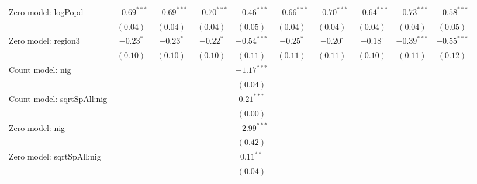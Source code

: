 \begin{center}
\begin{longtable}{l c c c c c c c c c}
Zero model: logPopd            & $-0.69^{***}$ & $-0.69^{***}$ & $-0.70^{***}$ & $-0.46^{***}$   & $-0.66^{***}$ & $-0.70^{***}$   & $-0.64^{***}$   & $-0.73^{***}$ & $-0.58^{***}$ \\
                               & $(0.04)$      & $(0.04)$      & $(0.04)$      & $(0.05)$        & $(0.04)$      & $(0.04)$        & $(0.04)$        & $(0.04)$      & $(0.05)$      \\
Zero model: region3            & $-0.23^{*}$   & $-0.23^{*}$   & $-0.22^{*}$   & $-0.54^{***}$   & $-0.25^{*}$   & $-0.20^{\cdot}$ & $-0.18^{\cdot}$ & $-0.39^{***}$ & $-0.55^{***}$ \\
                               & $(0.10)$      & $(0.10)$      & $(0.10)$      & $(0.11)$        & $(0.11)$      & $(0.11)$        & $(0.10)$        & $(0.11)$      & $(0.12)$      \\
Count model: nig               &               &               &               & $-1.17^{***}$   &               &                 &                 &               &               \\
                               &               &               &               & $(0.04)$        &               &                 &                 &               &               \\
Count model: sqrtSpAll:nig     &               &               &               & $0.21^{***}$    &               &                 &                 &               &               \\
                               &               &               &               & $(0.00)$        &               &                 &                 &               &               \\
Zero model: nig                &               &               &               & $-2.99^{***}$   &               &                 &                 &               &               \\
                               &               &               &               & $(0.42)$        &               &                 &                 &               &               \\
Zero model: sqrtSpAll:nig      &               &               &               & $0.11^{**}$     &               &                 &                 &               &               \\
                               &               &               &               & $(0.04)$        &               &                 &                 &               &               \\

\end{longtable}
\end{center}
